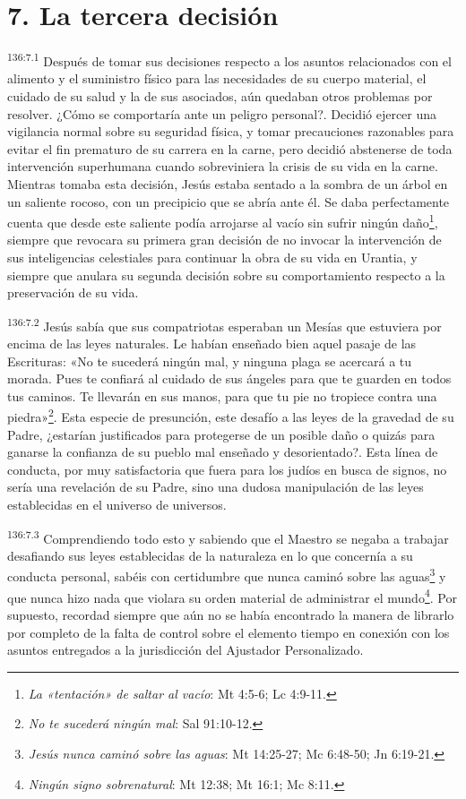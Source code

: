 \section*{7. La tercera decisión}
\par
\textsuperscript{136:7.1} Después de tomar sus decisiones respecto a los asuntos relacionados con el alimento y el suministro físico para las necesidades de su cuerpo material, el cuidado de su salud y la de sus asociados, aún quedaban otros problemas por resolver. ¿Cómo se comportaría ante un peligro personal?. Decidió ejercer una vigilancia normal sobre su seguridad física, y tomar precauciones razonables para evitar el fin prematuro de su carrera en la carne, pero decidió abstenerse de toda intervención superhumana cuando sobreviniera la crisis de su vida en la carne. Mientras tomaba esta decisión, Jesús estaba sentado a la sombra de un árbol en un saliente rocoso, con un precipicio que se abría ante él. Se daba perfectamente cuenta que desde este saliente podía arrojarse al vacío sin sufrir ningún daño\footnote{\textit{La «tentación» de saltar al vacío}: Mt 4:5-6; Lc 4:9-11.}, siempre que revocara su primera gran decisión de no invocar la intervención de sus inteligencias celestiales para continuar la obra de su vida en Urantia, y siempre que anulara su segunda decisión sobre su comportamiento respecto a la preservación de su vida.

\par
\textsuperscript{136:7.2} Jesús sabía que sus compatriotas esperaban un Mesías que estuviera por encima de las leyes naturales. Le habían enseñado bien aquel pasaje de las Escrituras: «No te sucederá ningún mal, y ninguna plaga se acercará a tu morada. Pues te confiará al cuidado de sus ángeles para que te guarden en todos tus caminos. Te llevarán en sus manos, para que tu pie no tropiece contra una piedra»\footnote{\textit{No te sucederá ningún mal}: Sal 91:10-12.}. Esta especie de presunción, este desafío a las leyes de la gravedad de su Padre, ¿estarían justificados para protegerse de un posible daño o quizás para ganarse la confianza de su pueblo mal enseñado y desorientado?. Esta línea de conducta, por muy satisfactoria que fuera para los judíos en busca de signos, no sería una revelación de su Padre, sino una dudosa manipulación de las leyes establecidas en el universo de universos.

\par
\textsuperscript{136:7.3} Comprendiendo todo esto y sabiendo que el Maestro se negaba a trabajar desafiando sus leyes establecidas de la naturaleza en lo que concernía a su conducta personal, sabéis con certidumbre que nunca caminó sobre las aguas\footnote{\textit{Jesús nunca caminó sobre las aguas}: Mt 14:25-27; Mc 6:48-50; Jn 6:19-21.} y que nunca hizo nada que violara su orden material de administrar el mundo\footnote{\textit{Ningún signo sobrenatural}: Mt 12:38; Mt 16:1; Mc 8:11.}. Por supuesto, recordad siempre que aún no se había encontrado la manera de librarlo por completo de la falta de control sobre el elemento tiempo en conexión con los asuntos entregados a la jurisdicción del Ajustador Personalizado.

